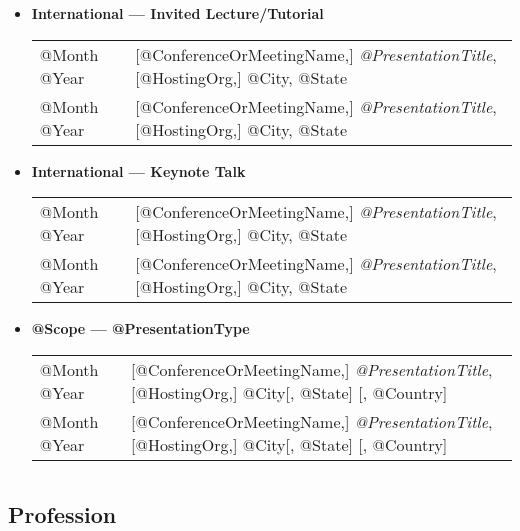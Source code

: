 \documentclass[10pt]{article}
\begin{document}
\begin{itemize}
\item[] \textbf{International --- Invited Lecture/Tutorial}
\\[1.3ex]
\begin{tabular}{l@{\quad\ }p{34em}} 
 @Month @Year 
 & [@ConferenceOrMeetingName,] \emph{@PresentationTitle},
   [@HostingOrg,]
   @City, @State
   \smallskip \\
 @Month @Year 
 & [@ConferenceOrMeetingName,] \emph{@PresentationTitle},
   [@HostingOrg,]
   @City, @State
\end{tabular}

\item[] \textbf{International --- Keynote Talk}
\\[1.3ex]
\begin{tabular}{l@{\quad\ }p{34em}} 
 @Month @Year 
 & [@ConferenceOrMeetingName,] \emph{@PresentationTitle},
   [@HostingOrg,]
   @City, @State
   \smallskip \\
 @Month @Year 
 & [@ConferenceOrMeetingName,] \emph{@PresentationTitle},
   [@HostingOrg,]
   @City, @State
\end{tabular}


\item[] \textbf{@Scope --- @PresentationType}
\\[1.3ex]
\begin{tabular}{l@{\quad\ }p{34em}} 
 @Month @Year 
 & [@ConferenceOrMeetingName,] \emph{@PresentationTitle},
   [@HostingOrg,]
   @City[, @State] [, @Country]
   \smallskip \\
 @Month @Year 
 & [@ConferenceOrMeetingName,] \emph{@PresentationTitle},
   [@HostingOrg,]
   @City[, @State] [, @Country]
   \smallskip \\
\end{tabular}
\end{itemize}


\section*{\service}

\subsection*{Profession}
\end{document}
